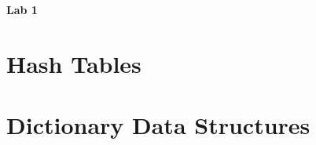 \documentclass[11pt]{article}
\newcommand{\floor}[1]{\lfloor {#1} \rfloor}
\begin{document}
	
\begin{center}
\Large{\textbf{Lab 1}}
\end{center}


\section{Hash Tables}


\section{Dictionary Data Structures}
\end{document}
